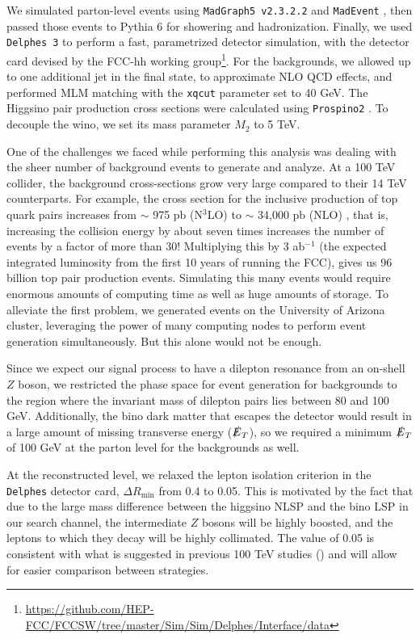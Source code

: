 We simulated parton-level events using \texttt{MadGraph5 v2.3.2.2} and \texttt{MadEvent} \citep{Alwall:2014hca}, then passed those events to Pythia 6 \citep{Sjostrand:2006za} for showering and hadronization. Finally, we used \texttt{Delphes 3} \citep{deFavereau:2013fsa} to perform a fast, parametrized detector simulation, with the detector card devised by the FCC-hh working group\footnote{\url{https://github.com/HEP-FCC/FCCSW/tree/master/Sim/Sim/Delphes/Interface/data}}. For the backgrounds, we allowed up to one additional jet in the final state, to approximate NLO QCD effects, and performed MLM matching with the \texttt{xqcut} parameter set to 40 GeV. The Higgsino pair production cross sections were calculated using \texttt{Prospino2} \citep{Beenakker:1999xh}. To decouple the wino, we set its mass parameter $M_2$ to 5 TeV.

One of the challenges we faced while performing this analysis was dealing with the sheer number of background events to generate and analyze. At a 100 TeV collider, the background cross-sections grow very large compared to their 14 TeV counterparts. For example, the cross section for the inclusive production of top quark pairs increases from $\sim$ 975 pb (N$^{3}$LO) to $\sim$ 34,000 pb (NLO) \citep{Mangano:2016jyj}, that is, increasing the collision energy by about seven times increases the number of events by a factor of more than 30! Multiplying this by 3 ab$^{-1}$ (the expected integrated luminosity from the first 10 years of running the FCC), gives us 96 billion top pair production events. Simulating this many events would require enormous amounts of computing time as well as huge amounts of storage. To alleviate the first problem, we generated events on the University of Arizona cluster, leveraging the power of many computing nodes to perform event generation simultaneously. But this alone would not be enough. 

Since we expect our signal process to have a dilepton resonance from an on-shell $Z$ boson, we restricted the phase space for event generation for backgrounds to the region where the invariant mass of dilepton pairs lies between 80 and 100 GeV. Additionally, the bino dark matter that escapes the detector would result in a large amount of missing transverse energy ($\slashed{E}_T$), so we required a minimum $\slashed{E}_T$ of 100 GeV at the parton level for the backgrounds as well. 

At the reconstructed level, we relaxed the lepton isolation criterion in the \texttt{Delphes} detector card, $\Delta R_\text{min}$ from 0.4 to 0.05. This is motivated by the fact that due to the large mass difference between the higgsino NLSP and the bino LSP in our search channel, the intermediate $Z$ bosons will be highly boosted, and the leptons to which they decay will be highly collimated. The value of 0.05 is consistent with what is suggested in previous 100 TeV studies (\citep{Acharya:2014pua,Gori:2014oua,Bramante:2014tba}) and will allow for easier comparison between strategies.


